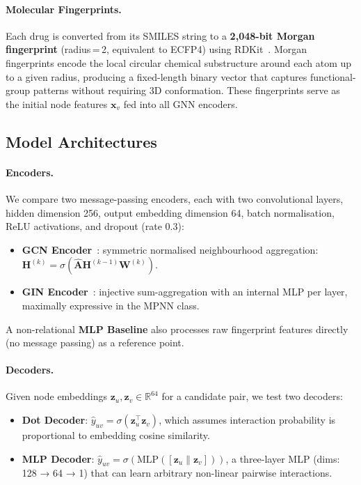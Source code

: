 \documentclass[11pt,a4paper]{article}
\begin{document}
\paragraph{Molecular Fingerprints.}
Each drug is converted from its SMILES string to a
\textbf{2{,}048-bit Morgan fingerprint} (radius\,=\,2,
equivalent to ECFP4) using RDKit~\cite{rdkit}.
Morgan fingerprints encode the local circular chemical substructure
around each atom up to a given radius, producing a fixed-length binary
vector that captures functional-group patterns without requiring 3D
conformation.
These fingerprints serve as the initial node features $\mathbf{x}_v$
fed into all GNN encoders.

\subsection{Model Architectures}

\paragraph{Encoders.}
We compare two message-passing encoders, each with two convolutional
layers, hidden dimension 256, output embedding dimension 64, batch
normalisation, ReLU activations, and dropout (rate 0.3):

\begin{itemize}[noitemsep]
  \item \textbf{GCN Encoder}~\cite{kipf2017}: symmetric normalised
        neighbourhood aggregation: $\mathbf{H}^{(k)} =
        \sigma(\hat{\mathbf{A}}\mathbf{H}^{(k-1)}\mathbf{W}^{(k)})$.
  \item \textbf{GIN Encoder}~\cite{xu2019}: injective sum-aggregation
        with an internal MLP per layer, maximally expressive in the MPNN
        class.
\end{itemize}

A non-relational \textbf{MLP Baseline} also processes raw fingerprint
features directly (no message passing) as a reference point.

\paragraph{Decoders.}
Given node embeddings $\mathbf{z}_u, \mathbf{z}_v \in \mathbb{R}^{64}$
for a candidate pair, we test two decoders:

\begin{itemize}[noitemsep]
  \item \textbf{Dot Decoder}: $\hat{y}_{uv} =
        \sigma(\mathbf{z}_u^\top \mathbf{z}_v)$, which assumes interaction
        probability is proportional to embedding cosine similarity.
  \item \textbf{MLP Decoder}: $\hat{y}_{uv} =
        \sigma(\text{MLP}([\mathbf{z}_u \| \mathbf{z}_v]))$, a
        three-layer MLP (dims: 128 → 64 → 1) that can learn arbitrary
        non-linear pairwise interactions.
\end{itemize}
\end{document}
